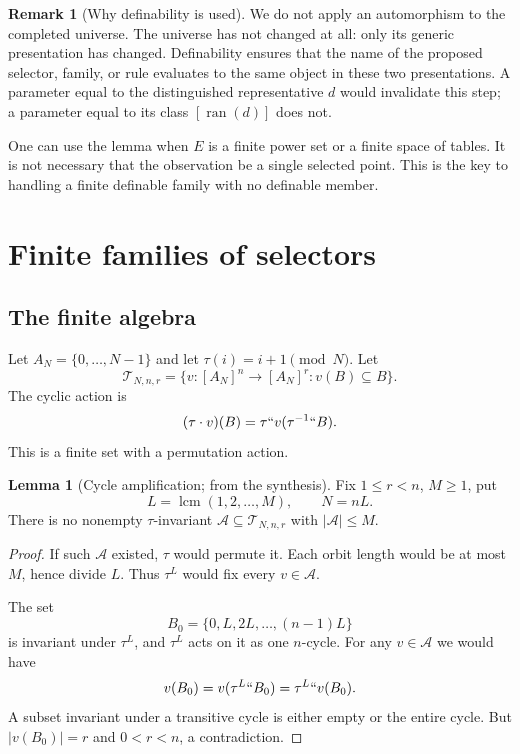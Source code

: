 \documentclass[11pt,letterpaper]{article}
\theoremstyle{definition}
\newtheorem{lemma}[definition]{Lemma}
\newtheorem{remark}[definition]{Remark}
\numberwithin{equation}{section}
\newcommand{\ran}{\operatorname{ran}}
\newcommand{\lcm}{\operatorname{lcm}}
\newcommand{\Tabs}{\mathscr T}
\begin{document}
\begin{remark}[Why definability is used]\label{rem:sameobject}
We do not apply an automorphism to the completed universe. The universe has not changed at all: only its generic presentation has changed. Definability ensures that the name of the proposed selector, family, or rule evaluates to the same object in these two presentations. A parameter equal to the distinguished representative $d$ would invalidate this step; a parameter equal to its class $[\ran(d)]$ does not.
\end{remark}

One can use the lemma when $E$ is a finite power set or a finite space of tables. It is not necessary that the observation be a single selected point. This is the key to handling a finite definable family with no definable member.

\section{Finite families of selectors}\label{sec:selectors}

\subsection{The finite algebra}

Let $A_N=\{0,\ldots,N-1\}$ and let $\tau(i)=i+1\pmod N$. Let
\[
 \Tabs_{N,n,r}=\{v:[A_N]^n\to[A_N]^r:
                                  v(B)\subseteq B\}.
\]
The cyclic action is
\[
 (\tau\cdot v)(B)=\tau``v(\tau^{-1}``B).
\]
This is a finite set with a permutation action.

\begin{lemma}[Cycle amplification; from the synthesis]\label{lem:amplification}
Fix $1\le r<n$, $M\ge1$, put
\[
 L=\lcm(1,2,\ldots,M),\qquad N=nL.
\]
There is no nonempty $\tau$-invariant $\mathcal A\subseteq\Tabs_{N,n,r}$ with $|\mathcal A|\le M$.
\end{lemma}

\begin{proof}
If such $\mathcal A$ existed, $\tau$ would permute it. Each orbit length would be at most $M$, hence divide $L$. Thus $\tau^L$ would fix every $v\in\mathcal A$.

The set
\[
 B_0=\{0,L,2L,\ldots,(n-1)L\}
\]
is invariant under $\tau^L$, and $\tau^L$ acts on it as one $n$-cycle. For any $v\in\mathcal A$ we would have
\[
 v(B_0)=v(\tau^L``B_0)=\tau^L``v(B_0).
\]
A subset invariant under a transitive cycle is either empty or the entire cycle. But $|v(B_0)|=r$ and $0<r<n$, a contradiction.
\end{proof}
\end{document}
